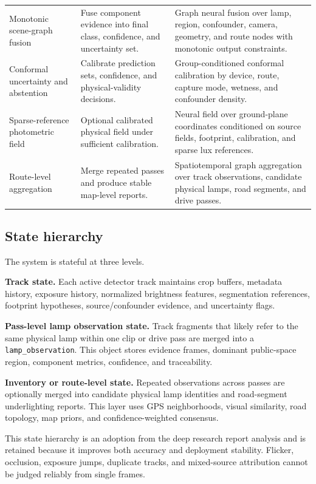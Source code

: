 \documentclass[11pt]{article}
\begin{document}
\begin{center}
\begin{tabular}{p{}p{}p{}}
Monotonic scene-graph fusion & Fuse component evidence into final class, confidence, and uncertainty set. & Graph neural fusion over lamp, region, confounder, camera, geometry, and route nodes with monotonic output constraints. \\
Conformal uncertainty and abstention & Calibrate prediction sets, confidence, and physical-validity decisions. & Group-conditioned conformal calibration by device, route, capture mode, wetness, and confounder density. \\
Sparse-reference photometric field & Optional calibrated physical field under sufficient calibration. & Neural field over ground-plane coordinates conditioned on source fields, footprint, calibration, and sparse lux references. \\
Route-level aggregation & Merge repeated passes and produce stable map-level reports. & Spatiotemporal graph aggregation over track observations, candidate physical lamps, road segments, and drive passes. \\
\bottomrule
\end{tabular}
\end{center}

\subsection{State hierarchy}

The system is stateful at three levels.

\textbf{Track state.} Each active detector track maintains crop buffers, metadata history, exposure history, normalized brightness features, segmentation references, footprint hypotheses, source/confounder evidence, and uncertainty flags.

\textbf{Pass-level lamp observation state.} Track fragments that likely refer to the same physical lamp within one clip or drive pass are merged into a \texttt{lamp\_observation}. This object stores evidence frames, dominant public-space region, component metrics, confidence, and traceability.

\textbf{Inventory or route-level state.} Repeated observations across passes are optionally merged into candidate physical lamp identities and road-segment underlighting reports. This layer uses GPS neighborhoods, visual similarity, road topology, map priors, and confidence-weighted consensus.

This state hierarchy is an adoption from the deep research report analysis and is retained because it improves both accuracy and deployment stability. Flicker, occlusion, exposure jumps, duplicate tracks, and mixed-source attribution cannot be judged reliably from single frames.
\end{document}
